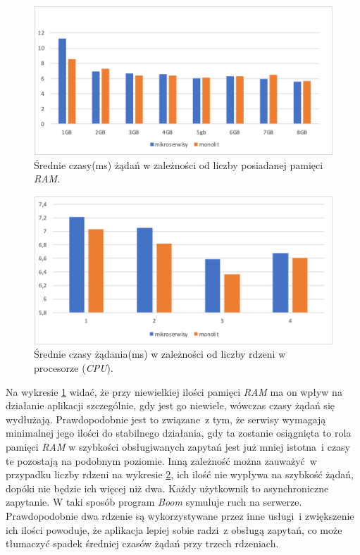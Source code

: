\begin{figure}[h!]
	\centering
		\includegraphics[width=12cm]{Rysunki/Rozdzial7/ramtest.png}
		\caption{Średnie czasy(ms) żądań w zależności od liczby posiadanej pamięci \textit{RAM}.}
		\label{fig:ramtest}
	\end{figure}
\begin{figure}[h!]
	\centering
		\includegraphics[width=12cm]{Rysunki/Rozdzial7/cputest.png}
		\caption{Średnie czasy żądania(ms) w zależności od liczby rdzeni w procesorze (\textit{CPU}).}
		\label{fig:cputest}
	\end{figure}
Na wykresie \ref{fig:ramtest} widać, że przy niewielkiej ilości pamięci \textit{RAM} ma on wpływ na działanie aplikacji szczególnie, gdy jest go niewiele, wówczas czasy żądań się wydłużają. Prawdopodobnie jest to związane~z tym, że serwisy wymagają minimalnej jego ilości do stabilnego działania, gdy ta zostanie osiągnięta to rola pamięci \textit{RAM} w szybkości obsługiwanych zapytań jest już mniej istotna~i czasy te pozostają na podobnym poziomie. 
Inną zależność można zauważyć~w przypadku liczby rdzeni na wykresie \ref{fig:cputest}, ich ilość nie wypływa na szybkość żądań, dopóki nie będzie ich więcej niż dwa. Każdy użytkownik to asynchroniczne zapytanie. W taki sposób program \textit{Boom} symuluje ruch na serwerze\cite{Ziade:2018}. Prawdopodobnie dwa rdzenie są wykorzystywane przez inne usługi~i zwiększenie ich ilości powoduje, że aplikacja lepiej sobie radzi~z obsługą zapytań, co może tłumaczyć spadek średniej czasów żądań przy trzech rdzeniach.

